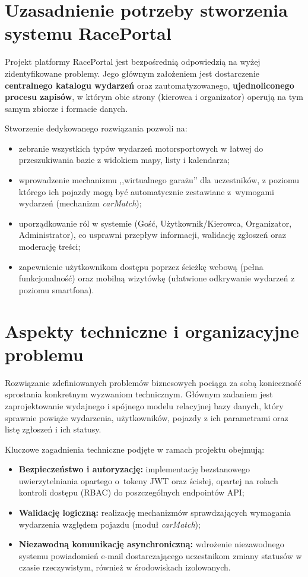 \documentclass{sprz}
\begin{document}
\section{Uzasadnienie potrzeby stworzenia systemu RacePortal}  
Projekt platformy RacePortal jest bezpośrednią odpowiedzią na wyżej zidentyfikowane problemy. Jego głównym założeniem jest dostarczenie \textbf{centralnego katalogu wydarzeń} oraz zautomatyzowanego, \textbf{ujednoliconego procesu zapisów}, w którym obie strony (kierowca i organizator) operują na tym samym zbiorze i formacie danych.

Stworzenie dedykowanego rozwiązania pozwoli na:
\begin{itemize}
    \item zebranie wszystkich typów wydarzeń motorsportowych w łatwej do przeszukiwania bazie z widokiem mapy, listy i kalendarza;
    \item wprowadzenie mechanizmu ,,wirtualnego garażu'' dla uczestników, z poziomu którego ich pojazdy mogą być automatycznie zestawiane z~wymogami wydarzeń (mechanizm \emph{carMatch});
    \item uporządkowanie ról w systemie (Gość, Użytkownik/Kierowca, Organizator, Administrator), co usprawni przepływ informacji, walidację zgłoszeń oraz moderację treści;
    \item zapewnienie użytkownikom dostępu poprzez ścieżkę webową (pełna funkcjonalność) oraz mobilną wizytówkę (ułatwione odkrywanie wydarzeń z poziomu smartfona).
\end{itemize}

\section{Aspekty techniczne i organizacyjne problemu}  
Rozwiązanie zdefiniowanych problemów biznesowych pociąga za sobą konieczność sprostania konkretnym wyzwaniom technicznym. Głównym zadaniem jest zaprojektowanie wydajnego i spójnego modelu relacyjnej bazy danych, który sprawnie powiąże wydarzenia, użytkowników, pojazdy z ich parametrami oraz listę zgłoszeń i ich statusy. 

Kluczowe zagadnienia techniczne podjęte w ramach projektu obejmują:
\begin{itemize}
    \item \textbf{Bezpieczeństwo i autoryzację:} implementację bezstanowego uwierzytelniania opartego o~tokeny JWT oraz ścisłej, opartej na rolach kontroli dostępu (RBAC) do poszczególnych endpointów API;
    \item \textbf{Walidację logiczną:} realizację mechanizmów sprawdzających wymagania wydarzenia względem pojazdu (moduł \emph{carMatch});
    \item \textbf{Niezawodną komunikację asynchroniczną:} wdrożenie niezawodnego systemu powiadomień e-mail dostarczającego uczestnikom zmiany statusów w czasie rzeczywistym, również w środowiskach izolowanych.
\end{itemize}
\end{document}

